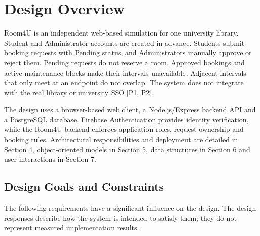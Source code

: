 
\section{Design Overview}

Room4U is an independent web-based simulation for one university library. Student and Administrator accounts are created in advance. Students submit booking requests with Pending status, and Administrators manually approve or reject them. Pending requests do not reserve a room. Approved bookings and active maintenance blocks make their intervals unavailable. Adjacent intervals that only meet at an endpoint do not overlap. The system does not integrate with the real library or university SSO [P1, P2].

The design uses a browser-based web client, a Node.js/Express backend API and a PostgreSQL database. Firebase Authentication provides identity verification, while the Room4U backend enforces application roles, request ownership and booking rules. Architectural responsibilities and deployment are detailed in Section 4, object-oriented models in Section 5, data structures in Section 6 and user interactions in Section 7.

\subsection{Design Goals and Constraints}

The following requirements have a significant influence on the design. The design responses describe how the system is intended to satisfy them; they do not represent measured implementation results.

